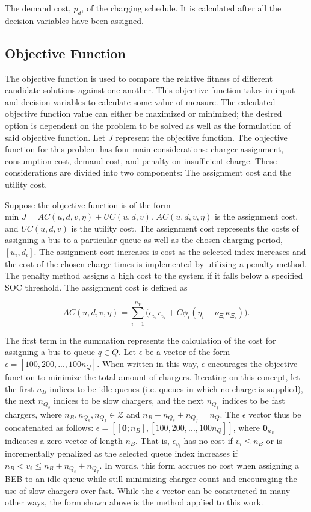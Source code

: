 \documentclass[11pt,a4paper,final]{article}
\newcommand{\AC}{AC(u, d, v, \eta)}         %
\newcommand{\UC}{UC(u, d, v)}               %
\begin{document}
The demand cost, \(p_d\), of the charging schedule. It is calculated after all the decision variables have been assigned.

\subsection{Objective Function}
\label{sec:objective-function}
The objective function is used to compare the relative fitness of different candidate solutions against one another.
This objective function takes in input and decision variables to calculate some value of measure. The calculated
objective function value can either be maximized or minimized; the desired option is dependent on the problem to be
solved as well as the formulation of said objective function. Let \(J\) represent the objective function. The objective
function for this problem has four main considerations: charger assignment, consumption cost, demand cost, and penalty
on insufficient charge. These considerations are divided into two components: The assignment cost and the utility cost.

Suppose the objective function is of the form \(\text{min } J = \AC + \UC\). \(\AC\) is the assignment cost, and \(\UC\) is
the utility cost. The assignment cost represents the costs of assigning a bus to a particular queue as well as the
chosen charging period, \([u_i, d_i]\). The assignment cost increases is cost as the selected index increases and the cost
of the chosen charge times is implemented by utilizing a penalty method. The penalty method assigns a high cost to the
system if it falls below a specified SOC threshold. The assignment cost is defined as

\begin{equation}
\label{eq:ac}
\AC = \sum_{i=1}^{n_V} \Big(\epsilon_{v_i}r_{v_i} + C \phi_i(\eta_i - \nu_{\Xi_i} \kappa_{\Xi_i}) \Big)\text{.}
\end{equation}

The first term in the summation represents the calculation of the cost for assigning a bus to queue \(q \in Q\). Let \(\epsilon\) be
a vector of the form \(\epsilon = [100, 200, ..., 100n_Q]\). When written in this way, \(\epsilon\) encourages the objective function to
minimize the total amount of chargers. Iterating on this concept, let the first \(n_B\) indices to be idle queues (i.e.
queues in which no charge is supplied), the next \(n_{Q_s}\) indices to be slow chargers, and the next \(n_{Q_f}\) indices
to be fast chargers, where \(n_B, n_{Q_s}, n_{Q_f} \in \mathcal{Z}\) and \(n_B + n_{Q_s} + n_{Q_f} = n_Q\). The \(\epsilon\) vector thus be
concatenated as follows: \(\epsilon = [[\mathbf{0}; n_B], [100, 200, ..., 100n_Q]]\), where \(\mathbf{0}_{n_B}\) indicates a zero
vector of length \(n_B\). That is, \(\epsilon_{v_i}\) has no cost if \(v_i \le n_B\) or is incrementally penalized as the selected
queue index increases if \(n_B < v_i \le n_B + n_{Q_s} + n_{Q_f}\). In words, this form accrues no cost when assigning a BEB
to an idle queue while still minimizing charger count and encouraging the use of slow chargers over fast. While the \(\epsilon\)
vector can be constructed in many other ways, the form shown above is the method applied to this work.
\end{document}
